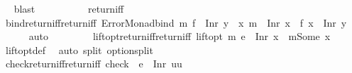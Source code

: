 \begin{isabellebody}
\isadelimproof
\ %
\endisadelimproof
%
\isatagproof
{}\isamarkupfalse%
\ blast%
\endisatagproof
{\isafoldproof}%
%
\isadelimproof
%
\endisadelimproof
\ \isanewline
\ \ \ \ \isanewline
\ \ \isamarkupfalse%
\ return{\isacharunderscore}{\kern0pt}iff\isanewline
\ \ \ \ \ \ \isanewline
\ \ \isamarkupfalse%
\ bind{\isacharunderscore}{\kern0pt}return{\isacharunderscore}{\kern0pt}iff{\isacharbrackleft}{\kern0pt}return{\isacharunderscore}{\kern0pt}iff{\isacharbrackright}{\kern0pt}{\isacharcolon}{\kern0pt}\ {\isachardoublequoteopen}Error{\isacharunderscore}{\kern0pt}Monad{\isachardot}{\kern0pt}bind\ m\ f\ {\isacharequal}{\kern0pt}\ Inr\ y\ {\isasymlongleftrightarrow}\ {\isacharparenleft}{\kern0pt}{\isasymexists}x{\isachardot}{\kern0pt}\ m\ {\isacharequal}{\kern0pt}\ Inr\ x\ {\isasymand}\ f\ x\ {\isacharequal}{\kern0pt}\ Inr\ y{\isacharparenright}{\kern0pt}{\isachardoublequoteclose}\isanewline
%
\isadelimproof
\ \ \ \ %
\endisadelimproof
%
\isatagproof
{}\isamarkupfalse%
\ auto%
\endisatagproof
{\isafoldproof}%
%
\isadelimproof
\isanewline
%
\endisadelimproof
\ \ \ \ \isanewline
\ \ \isamarkupfalse%
\ lift{\isacharunderscore}{\kern0pt}opt{\isacharunderscore}{\kern0pt}return{\isacharunderscore}{\kern0pt}iff{\isacharbrackleft}{\kern0pt}return{\isacharunderscore}{\kern0pt}iff{\isacharbrackright}{\kern0pt}{\isacharcolon}{\kern0pt}\ {\isachardoublequoteopen}lift{\isacharunderscore}{\kern0pt}opt\ m\ e\ {\isacharequal}{\kern0pt}\ Inr\ x\ {\isasymlongleftrightarrow}\ m{\isacharequal}{\kern0pt}Some\ x{\isachardoublequoteclose}\isanewline
%
\isadelimproof
\ \ \ \ %
\endisadelimproof
%
\isatagproof
{}\isamarkupfalse%
\ lift{\isacharunderscore}{\kern0pt}opt{\isacharunderscore}{\kern0pt}def\ \isamarkupfalse%
\ {\isacharparenleft}{\kern0pt}auto\ split{\isacharcolon}{\kern0pt}\ option{\isachardot}{\kern0pt}split{\isacharparenright}{\kern0pt}%
\endisatagproof
{\isafoldproof}%
%
\isadelimproof
\isanewline
%
\endisadelimproof
\ \ \ \ \ \ \isanewline
\ \ \isamarkupfalse%
\ check{\isacharunderscore}{\kern0pt}return{\isacharunderscore}{\kern0pt}iff{\isacharbrackleft}{\kern0pt}return{\isacharunderscore}{\kern0pt}iff{\isacharbrackright}{\kern0pt}{\isacharcolon}{\kern0pt}\ {\isachardoublequoteopen}check\ {\isasymPhi}\ e\ {\isacharequal}{\kern0pt}\ Inr\ uu\ {\isasymlongleftrightarrow}\ {\isasymPhi}{\isachardoublequoteclose}\ \ \ \ \isanewline
%
\isadelimproof
\ \ \ \ %
\endisadelimproof
%
\isatagproof

\end{isabellebody}
